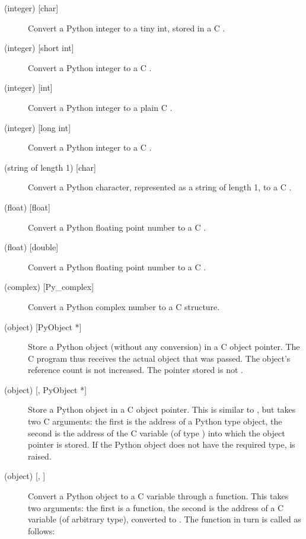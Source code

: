 \documentclass{manual}
\begin{document}
\begin{description}
\item[ (integer) {[char]}]
Convert a Python integer to a tiny int, stored in a C .

\item[ (integer) {[short int]}]
Convert a Python integer to a C .

\item[ (integer) {[int]}]
Convert a Python integer to a plain C .

\item[ (integer) {[long int]}]
Convert a Python integer to a C .

\item[ (string of length 1) {[char]}]
Convert a Python character, represented as a string of length 1, to a
C .

\item[ (float) {[float]}]
Convert a Python floating point number to a C .

\item[ (float) {[double]}]
Convert a Python floating point number to a C .

\item[ (complex) {[Py_complex]}]
Convert a Python complex number to a C  structure.

\item[ (object) {[PyObject *]}]
Store a Python object (without any conversion) in a C object pointer.
The C program thus receives the actual object that was passed.  The
object's reference count is not increased.  The pointer stored is not
\NULL{}.

\item[ (object) {[, PyObject *]}]
Store a Python object in a C object pointer.  This is similar to
, but takes two C arguments: the first is the address of a
Python type object, the second is the address of the C variable (of
type ) into which the object pointer is stored.
If the Python object does not have the required type,
 is raised.

\item[ (object) {[, ]}]
Convert a Python object to a C variable through a 
function.  This takes two arguments: the first is a function, the
second is the address of a C variable (of arbitrary type), converted
to .  The  function in turn is called as
follows:


\end{description}
\end{document}
